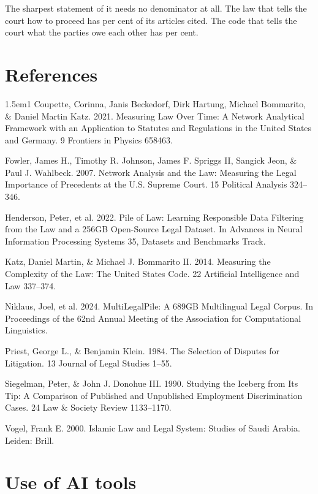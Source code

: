 \documentclass[11pt]{article}
\begin{document}
The sharpest statement of it needs no denominator at all. The law that tells
the court how to proceed has \nCCLShare{} per cent of its articles cited. The
code that tells the court what the parties owe each other has
\nCivilShare{} per cent.

\section*{References}

\begin{hangparas}{1.5em}{1}
Coupette, Corinna, Janis Beckedorf, Dirk Hartung, Michael Bommarito, \& Daniel
Martin Katz. 2021. Measuring Law Over Time: A Network Analytical Framework
with an Application to Statutes and Regulations in the United States and
Germany. 9 Frontiers in Physics 658463.

Fowler, James H., Timothy R. Johnson, James F. Spriggs II, Sangick Jeon, \&
Paul J. Wahlbeck. 2007. Network Analysis and the Law: Measuring the Legal
Importance of Precedents at the U.S. Supreme Court. 15 Political Analysis
324--346.

Henderson, Peter, et al. 2022. Pile of Law: Learning Responsible Data
Filtering from the Law and a 256GB Open-Source Legal Dataset. In Advances in
Neural Information Processing Systems 35, Datasets and Benchmarks Track.

Katz, Daniel Martin, \& Michael J. Bommarito II. 2014. Measuring the
Complexity of the Law: The United States Code. 22 Artificial Intelligence and
Law 337--374.

Niklaus, Joel, et al. 2024. MultiLegalPile: A 689GB Multilingual Legal Corpus.
In Proceedings of the 62nd Annual Meeting of the Association for Computational
Linguistics.

Priest, George L., \& Benjamin Klein. 1984. The Selection of Disputes for
Litigation. 13 Journal of Legal Studies 1--55.

Siegelman, Peter, \& John J. Donohue III. 1990. Studying the Iceberg from Its
Tip: A Comparison of Published and Unpublished Employment Discrimination
Cases. 24 Law \& Society Review 1133--1170.

Vogel, Frank E. 2000. Islamic Law and Legal System: Studies of Saudi Arabia.
Leiden: Brill.
\end{hangparas}

\section*{Use of AI tools}
\end{document}
